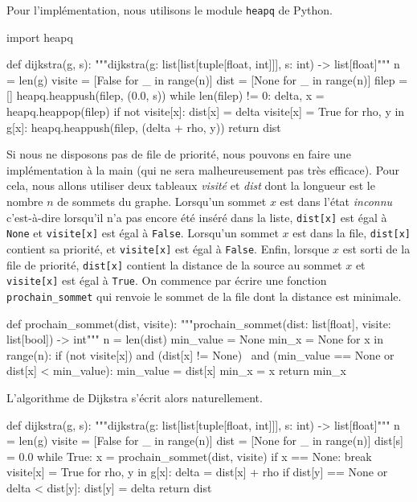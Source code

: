 \documentclass{magnolia}
\begin{document}
Pour l'implémentation, nous utilisons le module \verb!heapq! de Python.

\begin{pythoncodeline}
import heapq

def dijkstra(g, s):
    """dijkstra(g: list[list[tuple[float, int]]], s: int) -> list[float]"""
    n = len(g)
    visite = [False for _ in range(n)]
    dist = [None for _ in range(n)]
    filep = []
    heapq.heappush(filep, (0.0, s))
    while len(filep) != 0:
        delta, x = heapq.heappop(filep)
        if not visite[x]:
            dist[x] = delta
            visite[x] = True
            for rho, y in g[x]:
                heapq.heappush(filep, (delta + rho, y))
    return dist
\end{pythoncodeline}

\vspace{2ex}
Si nous ne disposons pas de file de priorité, nous pouvons en faire une implémentation
à la main (qui ne sera malheureusement pas très efficace). Pour cela, nous allons utiliser
deux tableaux \emph{visité} et \emph{dist} dont la longueur est le nombre $n$ de sommets du graphe. Lorsqu'un sommet $x$ est dans l'état \emph{inconnu} c'est-à-dire lorsqu'il
n'a pas encore été inséré dans la liste, \verb!dist[x]! est égal à \verb!None! et
\verb!visite[x]! est égal à \verb!False!. Lorsqu'un sommet $x$ est dans la file,
\verb!dist[x]! contient sa priorité, et \verb!visite[x]! est égal à \verb!False!.
Enfin, lorsque $x$ est sorti de la file de priorité, \verb!dist[x]! contient la distance
de la source au sommet $x$ et \verb!visite[x]! est égal à \verb!True!.
On commence par écrire une fonction \verb!prochain_sommet! qui renvoie le sommet de
la file dont la distance est minimale.

\begin{pythoncodeline}
def prochain_sommet(dist, visite):
    """prochain_sommet(dist: list[float], visite: list[bool]) -> int"""
    n = len(dist)
    min_value = None
    min_x = None
    for x in range(n):
        if (not visite[x]) and (dist[x] != None) \
                and (min_value == None or dist[x] < min_value):
            min_value = dist[x]
            min_x = x
    return min_x
\end{pythoncodeline}
\noindent
L'algorithme de Dijkstra s'écrit alors naturellement.

\begin{pythoncodeline}
def dijkstra(g, s):
    """dijkstra(g: list[list[tuple[float, int]]], s: int) -> list[float]"""
    n = len(g)
    visite = [False for _ in range(n)]
    dist = [None for _ in range(n)]
    dist[s] = 0.0
    while True:
        x = prochain_sommet(dist, visite)
        if x == None:
            break
        visite[x] = True
        for rho, y in g[x]:
            delta = dist[x] + rho
            if dist[y] == None or delta < dist[y]:
                dist[y] = delta
    return dist
\end{pythoncodeline}
\end{document}
